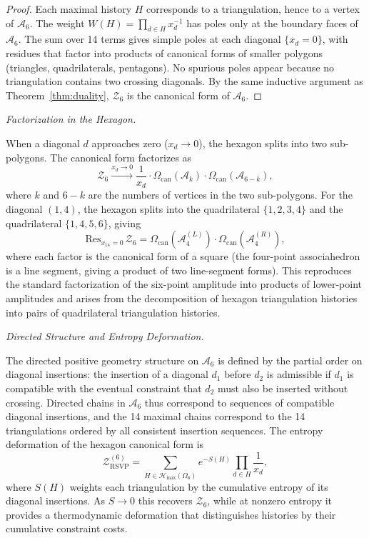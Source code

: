 \documentclass[12pt, oneside]{amsart}
\theoremstyle{plain}
\theoremstyle{definition}
\theoremstyle{remark}
\newcommand{\Sf}{S}
\newcommand{\OmKS}{\Omega}
\newcommand{\CF}{\Omega_{\mathrm{can}}}
\newcommand{\ZRSVP}{\mathcal{Z}_{\mathrm{RSVP}}}
\newcommand{\Hmax}{\mathcal{H}_{\max}}
\begin{document}
\begin{proof}
Each maximal history $H$ corresponds to a triangulation, hence to a vertex of $\mathcal{A}_6$. The weight $W(H) = \prod_{d \in H} x_d^{-1}$ has poles only at the boundary faces of $\mathcal{A}_6$. The sum over 14 terms gives simple poles at each diagonal $\{x_d = 0\}$, with residues that factor into products of canonical forms of smaller polygons (triangles, quadrilaterals, pentagons). No spurious poles appear because no triangulation contains two crossing diagonals. By the same inductive argument as Theorem~\ref{thm:duality}, $\mathcal{Z}_6$ is the canonical form of $\mathcal{A}_6$.
\end{proof}

\medskip\noindent\textit{Factorization in the Hexagon.}

When a diagonal $d$ approaches zero ($x_d \to 0$), the hexagon splits into two sub-polygons. The canonical form factorizes as
\[
  \mathcal{Z}_6 \xrightarrow{x_d \to 0} \frac{1}{x_d} \cdot \CF(\mathcal{A}_{k}) \cdot \CF(\mathcal{A}_{6-k}),
\]
where $k$ and $6-k$ are the numbers of vertices in the two sub-polygons. For the diagonal $(1,4)$, the hexagon splits into the quadrilateral $\{1,2,3,4\}$ and the quadrilateral $\{1,4,5,6\}$, giving
\[
  \mathrm{Res}_{x_{14}=0}\,\mathcal{Z}_6 = \CF(\mathcal{A}_4^{(L)}) \cdot \CF(\mathcal{A}_4^{(R)}),
\]
where each factor is the canonical form of a square (the four-point associahedron is a line segment, giving a product of two line-segment forms). This reproduces the standard factorization of the six-point amplitude into products of lower-point amplitudes and arises from the decomposition of hexagon triangulation histories into pairs of quadrilateral triangulation histories.

\medskip\noindent\textit{Directed Structure and Entropy Deformation.}

The directed positive geometry structure on $\mathcal{A}_6$ is defined by the partial order on diagonal insertions: the insertion of a diagonal $d_1$ before $d_2$ is admissible if $d_1$ is compatible with the eventual constraint that $d_2$ must also be inserted without crossing. Directed chains in $\mathcal{A}_6$ thus correspond to sequences of compatible diagonal insertions, and the 14 maximal chains correspond to the 14 triangulations ordered by all consistent insertion sequences. The entropy deformation of the hexagon canonical form is
\[
  \ZRSVP^{(6)} = \sum_{H \in \Hmax(\OmKS_6)} e^{-\Sf(H)} \prod_{d \in H} \frac{1}{x_d},
\]
where $\Sf(H)$ weights each triangulation by the cumulative entropy of its diagonal insertions. As $\Sf \to 0$ this recovers $\mathcal{Z}_6$, while at nonzero entropy it provides a thermodynamic deformation that distinguishes histories by their cumulative constraint costs.
\end{document}
